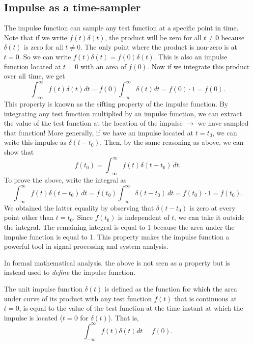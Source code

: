 \documentclass{ee102_notes}
\begin{document}
\subsection{Impulse as a time-sampler}
The impulse function can sample any test function at a specific point in time. Note that if we write $f(t)\delta(t)$, the product will be zero for all $t \neq 0$ because $\delta(t)$ is zero for all $t \neq 0$. The only point where the product is non-zero is at $t = 0$. So we can write $f(t)\delta(t) = f(0)\delta(t)$. This is also an impulse function located at $t = 0$ with an area of $f(0)$. Now if we integrate this product over all time, we get
\[\int_{-\infty}^{\infty} f(t) \delta(t) dt = f(0) \int_{-\infty}^{\infty} \delta(t) dt = f(0) \cdot 1 = f(0).\]
This property is known as the sifting property of the impulse function. By integrating any test function multiplied by an impulse function, we can extract the value of the test function at the location of the impulse $\rightarrow$ we have sampled that function! More generally, if we have an impulse located at $t = t_0$, we can write this impulse as $\delta(t - t_0)$. Then, by the same reasoning as above, we can show that\
\[
f(t_0) = \int_{-\infty}^{\infty} f(t) \delta(t - t_0) \, dt.
\]
To prove the above, write the integral as
\[
\int_{-\infty}^{\infty} f(t) \delta(t - t_0) \, dt = f(t_0) \int_{-\infty}^{\infty} \delta(t - t_0) \, dt = f(t_0) \cdot 1 = f(t_0).
\]
We obtained the latter equality by observing that $\delta(t - t_0)$ is zero at every point other than $t = t_0$. Since $f(t_0)$ is independent of $t$, we can take it outside the integral. The remaining integral is equal to 1 because the area under the impulse function is equal to 1. This property makes the impulse function a powerful tool in signal processing and system analysis.

In formal mathematical analysis, the above is not seen as a property but is instead used to \emph{define} the impulse function.
\begin{definition}
The unit impulse function $\delta(t)$ is defined as the function for which the area under curve of its product with any test function $f(t)$ that is continuous at $t = 0$, is equal to the value of the test function at the time instant at which the impulse is located ($t = 0$ for $\delta(t)$). That is,
\begin{equation}
\label{eq:impulse_def}
    \int_{-\infty}^{\infty} f(t) \delta(t) dt = f(0).
\end{equation}

\end{definition}
\end{document}
